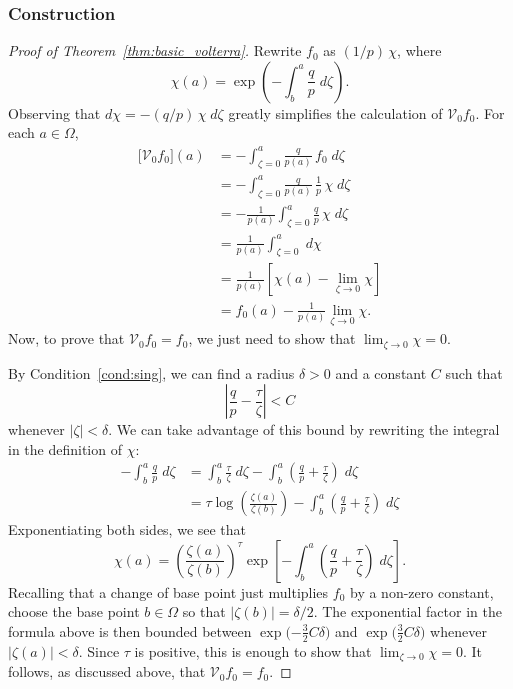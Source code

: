 \documentclass{article}
\theoremstyle{definition}
\theoremstyle{plain}
\newcommand{\hardpart}{\mathcal{V}_0}
\newcommand{\solproto}{f_0}
\newcommand{\domain}{\Omega}
\begin{document}
\subsubsection{Construction}\label{sec:construction}
\begin{proof}[Proof of Theorem~\ref{thm:basic_volterra}]
Rewrite $\solproto$ as $(1/p)\,\chi$, where
\[ \chi(a) = \exp\left(-\int_{b}^{a}\frac{q}{p}\;d\zeta\right). \]
Observing that $d\chi = -(q/p)\,\chi\;d\zeta$ greatly simplifies the calculation of $\hardpart \solproto$. For each $a \in \domain$,
\begin{align*}
\big[\hardpart \solproto\big](a) &= - \int_{\zeta=0}^{a} \frac{q}{p(a)}\,\solproto\;d\zeta \\
& = -\int_{\zeta=0}^{a} \frac{q}{p(a)}\,\frac{1}{p}\,\chi\;d\zeta \\
& = - \frac{1}{p(a)}  \int_{\zeta=0}^{a} \frac{q}{p}\,\chi\;d\zeta\\
& = \frac{1}{p(a)} \int_{\zeta=0}^{a}\;d\chi \\
& = \frac{1}{p(a)} \left[ \chi(a) - \lim_{\zeta \to 0} \chi \right] \\
& = \solproto(a) - \frac{1}{p(a)} \lim_{\zeta \to 0} \chi.
\end{align*}
Now, to prove that $\hardpart \solproto = \solproto$, we just need to show that $\lim_{\zeta \to 0} \chi = 0$.

By Condition~\eqref{cond:sing}, we can find a radius $\delta>0$ and a constant $C$ such that
\begin{equation}\label{eqn:sing-bound}
\left|\frac{q}{p} - \frac{\tau}{\zeta}\right| < C
\end{equation}
whenever $|\zeta| < \delta$. We can take advantage of this bound by rewriting the integral in the definition of $\chi$:
\begin{align*}
-\int_b^a \frac{q}{p}\;d\zeta & = \int_b^a \frac{\tau}{\zeta}\;d\zeta - \int_b^a \left( \frac{q}{p} + \frac{\tau}{\zeta} \right)\;d\zeta \\
& = \tau \log\left(\frac{\zeta(a)}{\zeta(b)}\right) - \int_b^a \left( \frac{q}{p} + \frac{\tau}{\zeta} \right)\;d\zeta
\end{align*}
Exponentiating both sides, we see that
\[ \chi(a) = \left(\frac{\zeta(a)}{\zeta(b)}\right)^\tau \exp\left[-\int_b^a \left( \frac{q}{p} + \frac{\tau}{\zeta} \right)\;d\zeta\right]. \]
Recalling that a change of base point just multiplies $\solproto$ by a non-zero constant, choose the base point $b \in \Omega$ so that $|\zeta(b)| = \delta/2$. The exponential factor in the formula above is then bounded between $\exp\big({-\tfrac{3}{2}C\delta}\big)$ and $\exp\big(\tfrac{3}{2}C\delta\big)$ whenever $|\zeta(a)| < \delta$. Since $\tau$ is positive, this is enough to show that $\lim_{\zeta \to 0} \chi = 0$. It follows, as discussed above, that $\hardpart \solproto = \solproto$. 
\end{proof}
\end{document}
